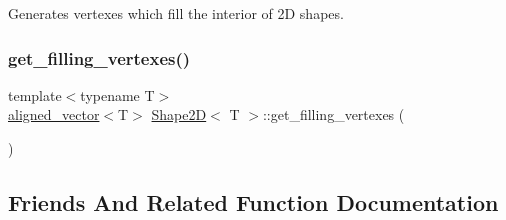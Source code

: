 Generates vertexes which fill the interior of 2D shapes. 

\mbox{\label{classShape2D_af67c7aed6e58b5aa0e3518a3ad1de75b}} 
\subsubsection{\texorpdfstring{get\+\_\+filling\+\_\+vertexes()}{get\_filling\_vertexes()}}
{\footnotesize\ttfamily template$<$typename T$>$ \\
\mbox{\hyperlink{type__definitions_8hpp_a087efd587d66b881646ef378f1919c90}{aligned\+\_\+vector}}$<$T$>$ \mbox{\hyperlink{classShape2D}{Shape2D}}$<$ T $>$\+::get\+\_\+filling\+\_\+vertexes (\begin{DoxyParamCaption}{ }\end{DoxyParamCaption})\hspace{0.3cm}{\ttfamily [inline]}}



\subsection{Friends And Related Function Documentation}
\mbox{\label{classShape2D_a75ed525e537ded17d42e3adad87bd701}} 
